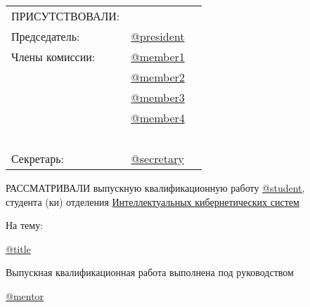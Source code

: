 \documentclass[a4paper,12pt]{article} %
\begin{document}
\begin{center} 		
	\begin{tabular}{lll}
		\vspace{0.2cm}
		ПРИСУТСТВОВАЛИ:\\
		\vspace{0.4cm}
		Председатель:  \hspace{2cm} 	& \underline{@president}  \\
		Члены комиссии:\hspace{2cm} 	& \underline{@member1}  \\
					   \hspace{2cm}  	& \underline{@member2}  \\
					   \hspace{2cm}		& \underline{@member3}  \\
					   \hspace{2cm}		& \underline{@member4}  \\
		\ \\ %
		\vspace{0.4cm}			
		Секретарь:     \hspace{2cm}		& \underline{@secretary}  \\	    
	\end{tabular}
\end{center}
	\vspace{-0.3cm}
	
	\hspace{1cm}РАССМАТРИВАЛИ выпускную квалификационную работу 
	\underline{@student,}\\
	
	\vspace{-0.4cm}
	\hspace{1cm}студента (ки) отделения \underline{Интеллектуальных кибернетических систем}

    \vspace{0.2cm}
	\hspace{1cm}На тему: 
	

	\hspace{1cm}\underline{@title}
	
    \vspace{0.2cm}
	\hspace{1cm}Выпускная квалификационная работа выполнена под руководством
	
	
    \hspace{1cm}\underline{@mentor}\\
\end{document}
